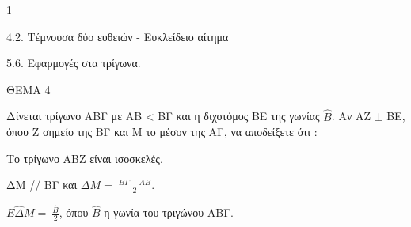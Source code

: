\begin{ylh}{1}
    \item 4.2. Τέμνουσα δύο ευθειών - Ευκλείδειο αίτημα
    \item 5.6. Εφαρμογές στα τρίγωνα.
\end{ylh}

ΘΕΜΑ 4

Δίνεται τρίγωνο ΑΒΓ με ΑΒ \textless{} ΒΓ και η διχοτόμος ΒΕ της γωνίας $\widehat{B}$. Αν ΑΖ $\bot$ ΒΕ, όπου Ζ σημείο της ΒΓ και Μ το μέσον της ΑΓ, να αποδείξετε ότι :

\begin{alist}
\item Το τρίγωνο ΑΒΖ είναι ισοσκελές. 

\item ΔΜ // ΒΓ και $\Delta Μ = \ \frac{Β\Gamma - ΑΒ}{2}$. 

\item $Ε\widehat{\Delta}Μ = \ \frac{\widehat{Β}}{2}$, όπου $\widehat{B}$ η γωνία του τριγώνου ΑΒΓ. 


\end{alist}
